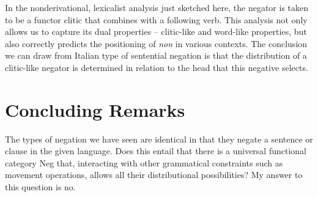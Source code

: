 \documentclass[output=paper]{langsci/langscibook}
\begin{document}
{\begin{exe}
\begin{xlist}
\begin{exe}
\begin{xlist}
\eal
{}
\zl

In the nonderivational, lexicalist analysis just sketched here,
the negator is taken to be a functor clitic that combines
with a following verb. This analysis
not only allows us to capture its dual properties -- clitic-like and
word-like properties, but also
correctly predicts the positioning of \emph{non} in various contexts.
The conclusion we can draw from Italian type of sentential negation
is that the distribution of a clitic-like negator is determined
in relation to the head that this negative selects.


\section{Concluding Remarks}


The types of negation we have seen are identical
in that they negate a sentence or clause in the given language.
Does this entail that there is a universal functional category Neg
that, interacting with other
grammatical constraints such as movement operations, allows all their
distributional possibilities?  My answer to this question is no.




\end{xlist}
\end{exe}
\end{xlist}
\end{exe}}
\end{document}
